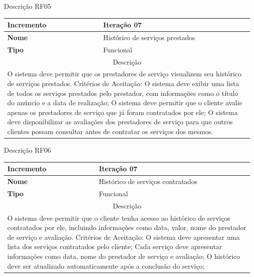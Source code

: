 \clearpage
\begin{quadro}[htb]
	\centering
	\caption{\label{Formatação do texto.}Descrição RF05}	
	\begin{tabular}{|l|p{11cm}|}
		\hline
		\textbf{Incremento}    & Iteração 07\\ \hline
		\textbf{Nome}    & Histórico de serviços prestados\\ \hline
		\textbf{Tipo}    & Funcional\\ \hline
		\multicolumn{2}{|c|}{Descrição}\\ \hline
		\multicolumn{2}{|p{12cm}|}{
			O sistema deve permitir que os prestadores de serviço visualizem seu histórico de serviços prestados. \newline
			\newline Critérios de Aceitação: \newline
			O sistema deve exibir uma lista de todos os serviços prestados pelo prestador, com informações como o título do anúncio e a data de realização; \newline
			\newline O sistema deve permitir que o cliente avalie apenas os prestadores de serviço que já foram contratados por ele; \newline
			\newline O sistema deve disponibilizar as avaliações dos prestadores de serviço para que outros clientes possam consultar antes de contratar os serviços dos mesmos.
			} \\ \hline
	\end{tabular}
\end{quadro}

\clearpage
\begin{quadro}[htb]
	\centering
	\caption{\label{Formatação do texto.}Descrição RF06}	
	\begin{tabular}{|l|p{11cm}|}
		\hline
		\textbf{Incremento}    & Iteração 07\\ \hline
		\textbf{Nome}    & Histórico de serviços contratados\\ \hline
		\textbf{Tipo}    & Funcional\\ \hline
		\multicolumn{2}{|c|}{Descrição}\\ \hline
		\multicolumn{2}{|p{12cm}|}{
			O sistema deve permitir que o cliente tenha acesso ao histórico de serviços contratados por ele, incluindo informações como data, valor, nome do prestador de serviço e avaliação. \newline
			\newline Critérios de Aceitação: \newline
			O sistema deve apresentar uma lista dos serviços contratados pelo cliente; \newline
            Cada serviço deve apresentar informações como data, nome do prestador de serviço e avaliação; \newline
			\newline O histórico deve ser atualizado automaticamente após a conclusão do serviço;
			} \\ \hline
	\end{tabular}
\end{quadro}


